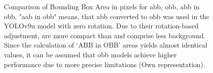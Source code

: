 
\begin{figure}[htbp]
    \centering
    
    \caption[Comparison of Bounding Box Area in pixels for \acrshort{abb}, \acrshort{obb}, abb in obb]{Comparison of Bounding Box Area in pixels for \acrshort{abb}, \acrshort{obb}, abb in obb. "aab in obb" means, that \acrlong{abb} converted to obb was used in the \acrshort{YOLO}v9u model with zero rotation. Due to their rotation-based adjustment,  are more compact than  and comprise less background. Since the calculation of ‘ABB in OBB’ areas yields almost identical values, it can be assumed that \acrshort{obb} models achieve higher performance due to more precise limitations (Own representation).}
    \label{fig:bbox_area}
\end{figure}


